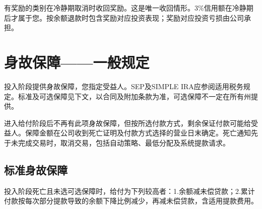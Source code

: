 \documentclass[UTF8,fontset=none,11pt,a4paper]{ctexart}
\begin{document}
有奖励的类别在冷静期取消时收回奖励。这是唯一收回情形。3\%信用额在冷静期后才属于您。按余额退款时包含奖励对应投资表现；奖励对应投资亏损由公司承担。


\section*{身故保障——一般规定}
投入阶段提供身故保障，您指定受益人。SEP及SIMPLE IRA应参阅适用税务规定。标准及可选保障见下文，以合同及附加条款为准，可选保障不一定在所有州提供。


进入给付阶段后不再有此项身故保障，但按所选付款方式，剩余保证付款可能给受益人。保障金额在公司收到死亡证明及付款方式选择的营业日末确定。死亡通知先于未完成交易时，取消交易，包括自动策略、最低分配及系统提款请求。


\subsection*{标准身故保障}
投入阶段死亡且未选可选保障时，给付为下列较高者：1.余额减未偿贷款；2.累计付款按每次部分提款导致的余额下降比例减少，再减未偿贷款，含适用提款费用。
\end{document}
